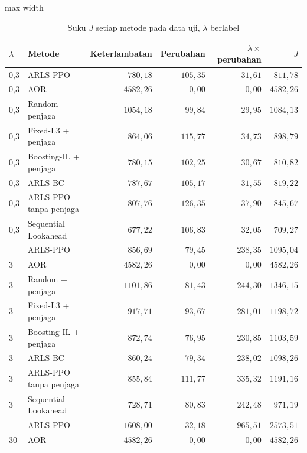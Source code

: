 \begin{table}[htbp]
\caption{Suku $J$ setiap metode pada data uji, $\lambda$ berlabel}
\label{tab:uji-uraian}
\centering\footnotesize
\setlength{\tabcolsep}{4pt}
\begin{adjustbox}{max width=\textwidth}
\begin{tabular}{llrrrr}
\toprule
$\lambda$ & Metode & Keterlambatan & Perubahan & $\lambda\times$perubahan & $J$ \\
\midrule
0{,}3 & ARLS-PPO & $780{,}18$ & $105{,}35$ & $31{,}61$ & $811{,}78$ \\
0{,}3 & AOR & $4582{,}26$ & $0{,}00$ & $0{,}00$ & $4582{,}26$ \\
0{,}3 & Random + penjaga & $1054{,}18$ & $99{,}84$ & $29{,}95$ & $1084{,}13$ \\
0{,}3 & Fixed-L3 + penjaga & $864{,}06$ & $115{,}77$ & $34{,}73$ & $898{,}79$ \\
0{,}3 & Boosting-IL + penjaga & $780{,}15$ & $102{,}25$ & $30{,}67$ & $810{,}82$ \\
0{,}3 & ARLS-BC & $787{,}67$ & $105{,}17$ & $31{,}55$ & $819{,}22$ \\
0{,}3 & ARLS-PPO tanpa penjaga & $807{,}76$ & $126{,}35$ & $37{,}90$ & $845{,}67$ \\
0{,}3 & Sequential Lookahead & $677{,}22$ & $106{,}83$ & $32{,}05$ & $709{,}27$ \\
\addlinespace
3 & ARLS-PPO & $856{,}69$ & $79{,}45$ & $238{,}35$ & $1095{,}04$ \\
3 & AOR & $4582{,}26$ & $0{,}00$ & $0{,}00$ & $4582{,}26$ \\
3 & Random + penjaga & $1101{,}86$ & $81{,}43$ & $244{,}30$ & $1346{,}15$ \\
3 & Fixed-L3 + penjaga & $917{,}71$ & $93{,}67$ & $281{,}01$ & $1198{,}72$ \\
3 & Boosting-IL + penjaga & $872{,}74$ & $76{,}95$ & $230{,}85$ & $1103{,}59$ \\
3 & ARLS-BC & $860{,}24$ & $79{,}34$ & $238{,}02$ & $1098{,}26$ \\
3 & ARLS-PPO tanpa penjaga & $855{,}84$ & $111{,}77$ & $335{,}32$ & $1191{,}16$ \\
3 & Sequential Lookahead & $728{,}71$ & $80{,}83$ & $242{,}48$ & $971{,}19$ \\
\addlinespace
30 & ARLS-PPO & $1608{,}00$ & $32{,}18$ & $965{,}51$ & $2573{,}51$ \\
30 & AOR & $4582{,}26$ & $0{,}00$ & $0{,}00$ & $4582{,}26$ \\

\end{tabular}
\end{adjustbox}
\end{table}
